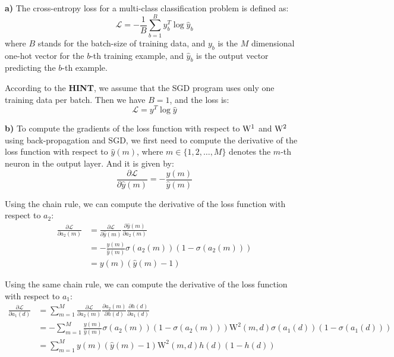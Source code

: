 \documentclass{homework}
\begin{document}
\textbf{a)} The cross-entropy loss for a multi-class classification problem is defined as:
\[\mathcal{L}=-\frac{1}{B} \sum_{b=1}^{B} {y}_{b}^{T} \log {\hat{y}}_{b}\]
where $B$ stands for the batch-size of training data, and $y_{b}$ is the $M$ dimensional one-hot vector for the $b$-th training example, and $\hat{y}_{b}$ is the output vector predicting the $b$-th example. 

According to the \textbf{HINT}, we assume that the SGD program uses only one training data per batch. Then we have $B=1$, and the loss is:
\[\mathcal{L}={y}^{T} \log {\hat{y}}\]

\textbf{b)} To compute the gradients of the loss function with respect to $\rm W^1$ and $\rm W^2$ using back-propagation and SGD, we first need to compute the derivative of the loss function with respect to $\hat{y}(m)$, where $m \in \{1,2,\ldots,M\}$ denotes the $m$-th neuron in the output layer. And it is given by:
\[\frac{\partial \mathcal{L}}{\partial \hat{y}(m)}=-\frac{y(m)}{\hat{y}(m)}\]

Using the chain rule, we can compute the derivative of the loss function with respect to $a_2$:
\begin{align*}
    \frac{\partial \mathcal{L}}{\partial a_{2}(m)}
    &=\frac{\partial \mathcal{L}}{\partial \hat{y}(m)} \frac{\partial \hat{y}(m)}{\partial a_{2}(m)}\\
    &=-\frac{y(m)}{\hat{y}(m)}\sigma(a_{2}(m))\left(1-\sigma(a_{2}(m))\right)\\
    &=y(m)\left(\hat{y}(m)-1\right)
\end{align*}

Using the same chain rule, we can compute the derivative of the loss function with respect to $a_1$:
\begin{align*}
    \frac{\partial \mathcal{L}}{\partial a_{1}(d)}
    &=\sum_{m=1}^{M}\frac{\partial \mathcal{L}}{\partial a_{2}(m)}\frac{\partial a_{2}(m)}{\partial h(d)}\frac{\partial h(d)}{\partial a_{1}(d)}\\
    &=-\sum_{m=1}^{M}\frac{y(m)}{\hat{y}(m)}\sigma(a_{2}(m))\left(1-\sigma(a_{2}(m))\right)\mathrm{W^{2}}(m,d)\sigma(a_{1}(d))\left(1-\sigma(a_{1}(d))\right)\\
    &=\sum_{m=1}^{M}y(m)\left(\hat{y}(m)-1\right)\mathrm{W^{2}}(m,d)h(d)(1-h(d))
\end{align*}
\end{document}
